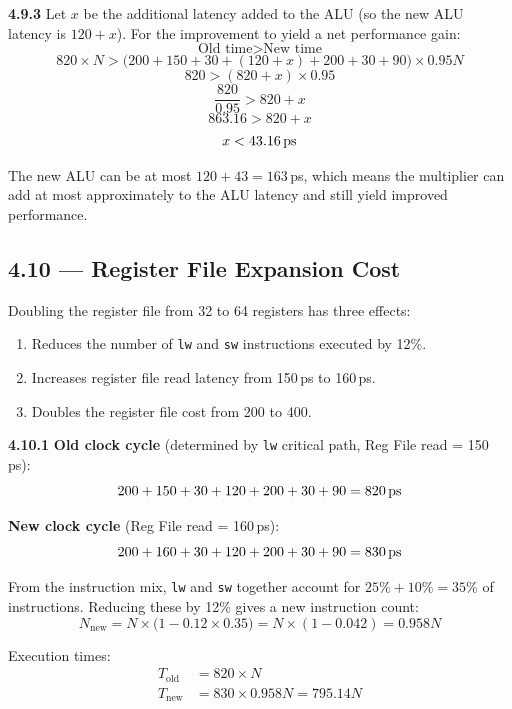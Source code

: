 \medskip\noindent\textbf{4.9.3}
Let $x$ be the additional latency added to the ALU (so the new ALU latency is
$120 + x$).  For the improvement to yield a net performance gain:
\[
  \text{Old time} > \text{New time}
\]
\[
  820 \times N > \bigl(200 + 150 + 30 + (120 + x) + 200 + 30 + 90\bigr)
  \times 0.95N
\]
\[
  820 > (820 + x) \times 0.95
\]
\[
  \frac{820}{0.95} > 820 + x
\]
\[
  863.16 > 820 + x
\]
\[
  x < 43.16\text{\,ps}
\]

The new ALU can be at most $120 + 43 = 163$\,ps, which means the multiplier
can add at most approximately  to the ALU latency and
still yield improved performance.

\subsection*{4.10 --- Register File Expansion Cost}
\hypertarget{sol-4.10}{}

Doubling the register file from 32 to 64 registers has three effects:
\begin{enumerate}
  \item Reduces the number of \texttt{lw} and \texttt{sw} instructions
        executed by 12\%.
  \item Increases register file read latency from 150\,ps to 160\,ps.
  \item Doubles the register file cost from 200 to 400.
\end{enumerate}

\medskip\noindent\textbf{4.10.1}
\textbf{Old clock cycle} (determined by \texttt{lw} critical path, Reg File
read = 150\,ps):
\[
  200 + 150 + 30 + 120 + 200 + 30 + 90 = 820\text{\,ps}
\]

\textbf{New clock cycle} (Reg File read = 160\,ps):
\[
  200 + 160 + 30 + 120 + 200 + 30 + 90 = 830\text{\,ps}
\]

From the instruction mix, \texttt{lw} and \texttt{sw} together account for
$25\% + 10\% = 35\%$ of instructions.  Reducing these by 12\% gives a new
instruction count:
\[
  N_{\text{new}} = N \times \bigl(1 - 0.12 \times 0.35\bigr)
  = N \times (1 - 0.042) = 0.958N
\]

Execution times:
\begin{align*}
  T_{\text{old}} &= 820 \times N \\
  T_{\text{new}} &= 830 \times 0.958N = 795.14N
\end{align*}

